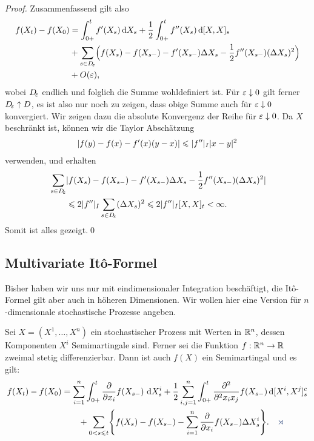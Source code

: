\begin{proof}
Zusammenfassend gilt also
\begin{align*}
f(X_t)-f(X_0) &= 
\int_{0+}^t f'(X_s)\,\mathrm{d} X_s + 
\frac{1}{2}\int_{0+}^t f''(X_s)\,\mathrm{d}[X,X]_s\\
&+
\sum_{s\in D_{\!\varepsilon}}
\Bigl(f(X_{s})-f(X_{s-})
-
f'(X_{s-})\Delta X_s - \frac{1}{2}f''(X_{s-})(\Delta X_s)^2
\Bigr)\\
&+ O(\varepsilon),
\end{align*}
wobei $D_{\!\varepsilon}$ endlich und folglich die Summe wohldefiniert ist.
Für $\varepsilon\downarrow 0$ gilt ferner $D_{\!\varepsilon}\uparrow D$, es ist also nur noch zu
zeigen, dass obige Summe auch für $\varepsilon \downarrow 0$ konvergiert. Wir zeigen
dazu die absolute Konvergenz der Reihe für $\varepsilon\downarrow 0$. Da $X$ beschränkt
ist, können wir die Taylor Abschätzung
\begin{align*}
\lvert f(y)-f(x)-f'(x)(y-x)\rvert\leqslant \lvert f''\rvert_I\lvert x-y\rvert^2
\end{align*}
verwenden, und erhalten
\begin{align*}
&\sum_{s\in D_{\!\varepsilon}}
\lvert f(X_{s})-f(X_{s-})
-
f'(X_{s-})\Delta X_s - \frac{1}{2}f''(X_{s-})(\Delta X_s)^2
\rvert\\
&\qquad\leqslant
2\lvert f''\rvert_I \sum_{s\in D_{\!\varepsilon}}
(\Delta X_s)^2
\leqslant
2\lvert f''\rvert_I [X,X]_t < \infty.
\end{align*}
Somit ist alles gezeigt.\qed
\end{proof}

\subsection{Multivariate Itô-Formel}

Bisher haben wir uns nur mit eindimensionaler Integration beschäftigt, die
Itô-Formel gilt aber auch in höheren Dimensionen. Wir wollen hier eine Version
für $n$-dimensionale stochastische Prozesse angeben.

\begin{theorem}
\label{prop:2.22}
  Sei $X=(X^1,\ldots,X^n)$ ein stochastischer Prozess mit Werten in
  $\mathbb{R}^n$, dessen Komponenten $X^i$ Semimartingale sind. Ferner sei
  die Funktion $f:\mathbb{R}^n\to\mathbb{R}$ zweimal stetig differenzierbar.
  Dann ist auch $f(X)$ ein Semimartingal und es gilt:
\begin{align*}
  f(X_t)-f(X_0) & = \sum_{i=1}^n \int_{0+}^t \frac{\partial}{\partial
    x_i} f(X_{s-})\, \dX_s^i + \frac{1}{2} \sum_{i,j=1}^n
  \int_{0+}^t \frac{\partial^2}{\partial^2 x_ix_j} f(X_{s-})\,
  \diffd[X^i,X^j]_s^c \\ & \qquad + \sum_{0<s\le t} 
  \Biggl\{f(X_s)-f(X_{s-})
    - \sum_{i=1}^n \frac{\partial}{\partial x_i} f(X_{s-}) \Delta
    X^i_s \Biggr\}.\fish
\end{align*}
\end{theorem}

